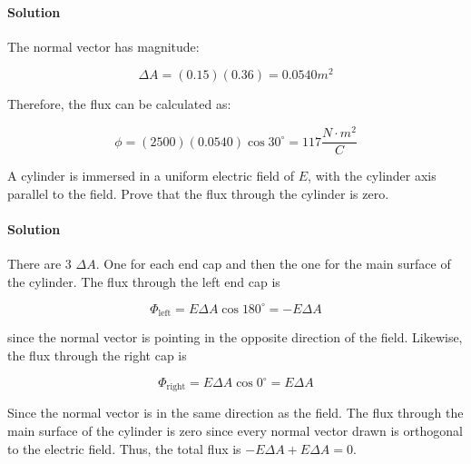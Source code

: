 \documentclass{scrartcl}
\theoremstyle{definition}
\begin{document}
	\paragraph{Solution} The normal vector has magnitude:
	
	$$
	\Delta A = (0.15)(0.36) = 0.0540 m^2
	$$
	
	\noindent Therefore, the flux can be calculated as:
	
	$$
	\phi = (2500)(0.0540) \cos 30^\circ = 117 \frac{N \cdot m^2}{C}
	$$
	
	\begin{example}
		A cylinder is immersed in a uniform electric field of $E$, with the cylinder axis parallel to the field. Prove that the flux through the cylinder is zero.
	\end{example}
	
	\paragraph{Solution} There are 3 $\Delta A$. One for each end cap and then the one for the main surface of the cylinder. The flux through the left end cap is 
	
	$$
	\Phi_\text{left} = E \Delta A \cos 180^\circ = - E \Delta A
	$$
	
	\noindent since the normal vector is pointing in the opposite direction of the field. Likewise, the flux through the right cap is 
	
	$$
	\Phi_\text{right} = E \Delta A \cos 0^\circ = E \Delta A
	$$
	
	\noindent Since the normal vector is in the same direction as the field. The flux through the main surface of the cylinder is zero since every normal vector drawn is orthogonal to the electric field. Thus, the total flux is $- E \Delta A + E \Delta A = 0$.
	
\end{document}
